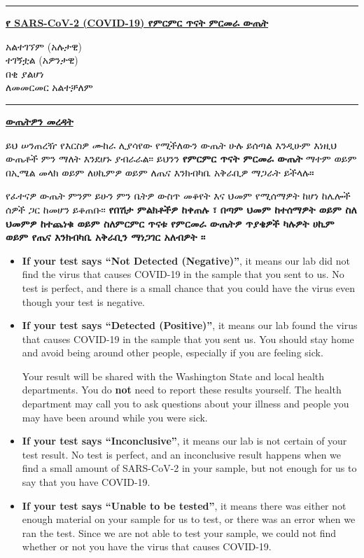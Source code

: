 \documentclass[10pt]{article}
\newcommand{\PageLine}{\rule{\textwidth}{0.25mm}}
\begin{document}
\bigskip
\PageLine

\large \underline{\textbf{የ SARS-CoV-2 (COVID-19) የምርምር ጥናት ምርመራ ውጤት}}

አልተገኘም (አሉታዊ)\\
ተገኝቷል (አዎንታዊ)\\
በቂ ያልሆነ\\
ለመመርመር አልተቻለም\\

\PageLine
\bigskip

\large \underline{\textbf{ውጤትዎን መረዳት}}

ይህ ሠንጠረዥ የእርስዎ ሙከራ ሊያሳየው የሚችለውን ውጤት ሁሉ ይሰጣል እንዲሁም እነዚህ ውጤቶች ምን ማለት
እንደሆኑ ያብራራል፡፡ ይህንን \textbf{የምርምር ጥናት ምርመራ ውጤት} ማተም ወይም በኢሜል መላክ ወይም
ለሀኪምዎ ወይም ለጤና እንክብካቤ አቅራቢዎ ማጋራት ይችላሉ።

የፈተናዎ ውጤት ምንም ይሁን ምን ቤትዎ ውስጥ መቆየት እና ህመም የሚሰማዎት ከሆነ ከሌሎች ሰዎች ጋር ከመሆን
ይቆጠቡ፡፡ \textbf{የበሽታ ምልክቶችዎ ከቀጠሉ ፣ በጣም ህመም ከተሰማዎት ወይም ስለ ህመምዎ ከተጨነቁ ወይም
ስለምርምር ጥናቱ የምርመራ ውጤትዎ ጥያቄዎች ካሉዎት ሀኪም ወይም የጤና እንክብካቤ አቅራቢን ማነጋገር አለብዎት
፡፡}

\begin{itemize}


\item

  \textbf{If your test says ``Not Detected (Negative)''}, it means our lab did not find the
  virus that causes COVID-19 in the sample that you sent to us. No test is
  perfect, and there is a small chance that you could have the virus even though
  your test is negative.

\item

  \textbf{If your test says ``Detected (Positive)''}, it means our
  lab found the virus that causes COVID-19 in the sample that you sent us. You
  should stay home and avoid being around other people, especially if you are
  feeling sick.

  Your result will be shared with the Washington State and local health
  departments. You do \textbf{not} need to report these results yourself. The
  health department may call you to ask questions about your illness and people
  you may have been around while you were sick.

\item

  \textbf{If your test says ``Inconclusive''}, it means our lab is not certain
  of your test result. No test is perfect, and an inconclusive result happens
  when we find a small amount of SARS-CoV-2 in your sample, but not enough for
  us to say that you have COVID-19.

\item

  \textbf{If your test says ``Unable to be tested''}, it means there was either
  not enough material on your sample for us to test, or there was an error when
  we ran the test. Since we are not able to test your sample, we could not find
  whether or not you have the virus that causes COVID-19.

\end{itemize}
\end{document}
